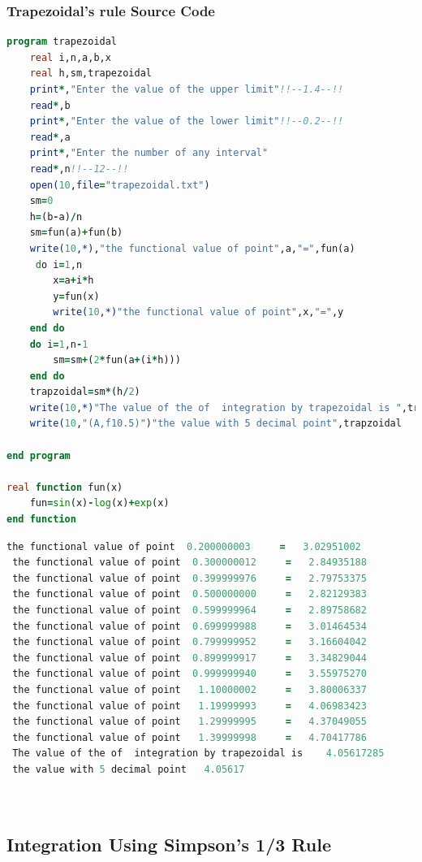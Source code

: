\documentclass{article}
\begin{document}
\subsubsection{Trapezoidal's rule Source Code}
\begin{lstlisting}[language=Fortran,caption=Integration by Trapezoidal's Rule]
program trapezoidal
    real i,n,a,b,x
    real h,sm,trapezoidal
    print*,"Enter the value of the upper limit"!!--1.4--!!
    read*,b
    print*,"Enter the value of the lower limit"!!--0.2--!!
    read*,a
    print*,"Enter the number of any interval"
    read*,n!!--12--!!
    open(10,file="trapezoidal.txt")
    sm=0
    h=(b-a)/n
    sm=fun(a)+fun(b)
    write(10,*),"the functional value of point",a,"=",fun(a)
     do i=1,n
        x=a+i*h
        y=fun(x)
        write(10,*)"the functional value of point",x,"=",y
    end do
    do i=1,n-1
        sm=sm+(2*fun(a+(i*h)))
    end do
    trapzoidal=sm*(h/2)
    write(10,*)"The value of the of  integration by trapezoidal is ",trapzoidal
    write(10,"(A,f10.5)")"the value with 5 decimal point",trapzoidal

end program

real function fun(x)
    fun=sin(x)-log(x)+exp(x)
end function

\end{lstlisting}
\begin{lstlisting}[language=Fortran,caption=Trapezoidal rule Output]
 the functional value of point  0.200000003     =   3.02951002    
 the functional value of point  0.300000012     =   2.84935188    
 the functional value of point  0.399999976     =   2.79753375    
 the functional value of point  0.500000000     =   2.82129383    
 the functional value of point  0.599999964     =   2.89758682    
 the functional value of point  0.699999988     =   3.01464534    
 the functional value of point  0.799999952     =   3.16604042    
 the functional value of point  0.899999917     =   3.34829044    
 the functional value of point  0.999999940     =   3.55975270    
 the functional value of point   1.10000002     =   3.80006337    
 the functional value of point   1.19999993     =   4.06983423    
 the functional value of point   1.29999995     =   4.37049055    
 the functional value of point   1.39999998     =   4.70417786    
 The value of the of  integration by trapezoidal is    4.05617285    
 the value with 5 decimal point   4.05617

 
\end{lstlisting}
\subsection{Integration Using Simpson's 1/3 Rule}
\end{document}
